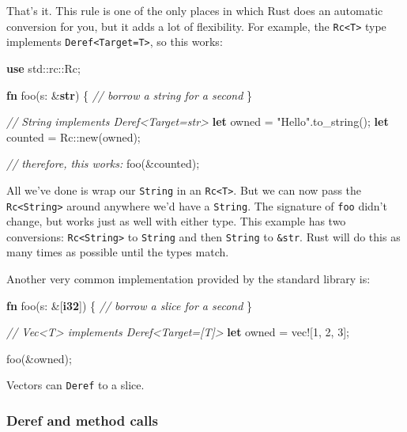 \documentclass[a4paper,]{book}
\newenvironment{Shaded}{\begin{snugshade}}{\end{snugshade}}
\newcommand{\KeywordTok}[1]{\textcolor[rgb]{0.13,0.29,0.53}{\textbf{{#1}}}}
\newcommand{\DecValTok}[1]{\textcolor[rgb]{0.00,0.00,0.81}{{#1}}}
\newcommand{\StringTok}[1]{\textcolor[rgb]{0.31,0.60,0.02}{{#1}}}
\newcommand{\CommentTok}[1]{\textcolor[rgb]{0.56,0.35,0.01}{\textit{{#1}}}}
\newcommand{\OtherTok}[1]{\textcolor[rgb]{0.56,0.35,0.01}{{#1}}}
\newcommand{\NormalTok}[1]{{#1}}
\begin{document}
That's it. This rule is one of the only places in which Rust does an
automatic conversion for you, but it adds a lot of flexibility. For
example, the \texttt{Rc\textless{}T\textgreater{}} type implements
\texttt{Deref\textless{}Target=T\textgreater{}}, so this works:

\begin{Shaded}
\begin{Highlighting}[]
\KeywordTok{use} \NormalTok{std::rc::Rc;}

\KeywordTok{fn} \NormalTok{foo(s: &}\KeywordTok{str}\NormalTok{) \{}
    \CommentTok{// borrow a string for a second}
\NormalTok{\}}

\CommentTok{// String implements Deref<Target=str>}
\KeywordTok{let} \NormalTok{owned = }\StringTok{"Hello"}\NormalTok{.to_string();}
\KeywordTok{let} \NormalTok{counted = Rc::new(owned);}

\CommentTok{// therefore, this works:}
\NormalTok{foo(&counted);}
\end{Highlighting}
\end{Shaded}

All we've done is wrap our \texttt{String} in an
\texttt{Rc\textless{}T\textgreater{}}. But we can now pass the
\texttt{Rc\textless{}String\textgreater{}} around anywhere we'd have a
\texttt{String}. The signature of \texttt{foo} didn't change, but works
just as well with either type. This example has two conversions:
\texttt{Rc\textless{}String\textgreater{}} to \texttt{String} and then
\texttt{String} to \texttt{\&str}. Rust will do this as many times as
possible until the types match.

Another very common implementation provided by the standard library is:

\begin{Shaded}
\begin{Highlighting}[]
\KeywordTok{fn} \NormalTok{foo(s: &[}\KeywordTok{i32}\NormalTok{]) \{}
    \CommentTok{// borrow a slice for a second}
\NormalTok{\}}

\CommentTok{// Vec<T> implements Deref<Target=[T]>}
\KeywordTok{let} \NormalTok{owned = }\OtherTok{vec!}\NormalTok{[}\DecValTok{1}\NormalTok{, }\DecValTok{2}\NormalTok{, }\DecValTok{3}\NormalTok{];}

\NormalTok{foo(&owned);}
\end{Highlighting}
\end{Shaded}

Vectors can \texttt{Deref} to a slice.

\subsubsection{Deref and method calls}\label{deref-and-method-calls}
\end{document}
